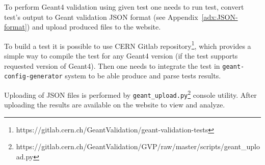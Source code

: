 To perform Geant4 validation using given test one needs to run test, convert test's output to Geant validation JSON format (see Appendix~\ref{adx:JSON-format}) and upload produced files to the website.

To build a test it is possible to use CERN Gitlab repository\footnote{https://gitlab.cern.ch/GeantValidation/geant-validation-tests}, which provides a simple way to compile the test for any Geant4 version (if the test supports requested version of Geant4).
Then one needs to integrate the test in {\tt geant-config-generator} system to be able produce and parse tests results.

Uploading of JSON files is performed by {\tt geant\_upload.py}\footnote{https://gitlab.cern.ch/GeantValidation/GVP/raw/master/scripts/geant\_upload.py} console utility.
After uploading the results are available on the website to view and analyze.




